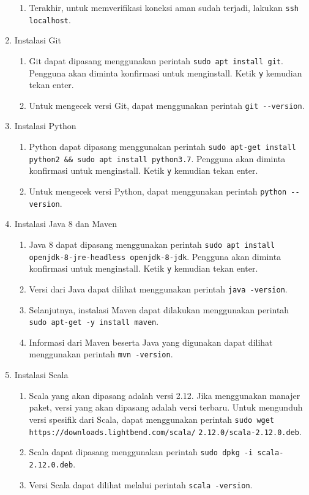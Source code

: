 \begin{enumerate}
\begin{enumerate}
    \item Terakhir, untuk memverifikasi koneksi aman sudah terjadi, lakukan \verb|ssh localhost|.
  \end{enumerate}
  \item Instalasi Git
  \begin{enumerate}
    \item Git dapat dipasang menggunakan perintah \verb|sudo apt install git|. Pengguna akan diminta konfirmasi untuk menginstall. Ketik \verb|y| kemudian tekan enter.
    \item Untuk mengecek versi Git, dapat menggunakan perintah \verb|git --version|.
  \end{enumerate}
  \item Instalasi Python
  \begin{enumerate}
    \item Python dapat dipasang menggunakan perintah \verb|sudo apt-get install python2 && sudo apt install python3.7|. Pengguna akan diminta konfirmasi untuk menginstall. Ketik \verb|y| kemudian tekan enter.
    \item Untuk mengecek versi Python, dapat menggunakan perintah \verb|python --version|.
  \end{enumerate}
  \item Instalasi Java 8 dan Maven
  \begin{enumerate}
    \item Java 8 dapat dipasang menggunakan perintah \verb|sudo apt install openjdk-8-jre-headless openjdk-8-jdk|. Pengguna akan diminta konfirmasi untuk menginstall. Ketik \verb|y| kemudian tekan enter.
    \item Versi dari Java dapat dilihat menggunakan perintah \verb|java -version|.
    \item Selanjutnya, instalasi Maven dapat dilakukan menggunakan perintah \verb| sudo apt-get -y install maven|.
    \item Informasi dari Maven beserta Java yang digunakan dapat dilihat menggunakan perintah \verb|mvn -version|.
  \end{enumerate}
  \item Instalasi Scala
  \begin{enumerate}
    \item Scala yang akan dipasang adalah versi 2.12. Jika menggunakan manajer paket, versi yang akan dipasang adalah versi terbaru. Untuk mengunduh versi spesifik dari Scala, dapat menggunakan perintah \verb|sudo wget  https://downloads.lightbend.com/scala/| \verb|2.12.0/scala-2.12.0.deb|.
    \item Scala dapat dipasang menggunakan perintah \verb|sudo dpkg -i scala-2.12.0.deb|.
    \item Versi Scala dapat dilihat melalui perintah \verb|scala -version|.
  \end{enumerate}
\end{enumerate}


